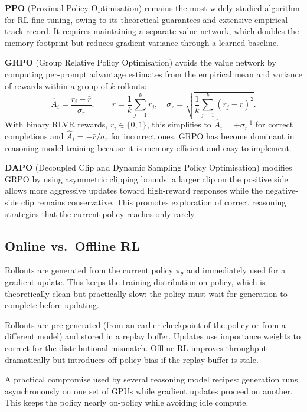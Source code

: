 \textbf{PPO} (Proximal Policy Optimisation)
remains the most widely studied algorithm for RL fine-tuning, owing
to its theoretical guarantees and extensive empirical track record.
It requires maintaining a separate value network, which doubles the
memory footprint but reduces gradient variance through a learned baseline.

\textbf{GRPO} (Group Relative Policy Optimisation) avoids
the value network by computing per-prompt advantage estimates from
the empirical mean and variance of rewards within a group of $k$
rollouts:
\begin{equation}
\label{eq:grpo-advantage}
\hat{A}_i = \frac{r_i - \bar{r}}{\sigma_r}, \qquad
\bar{r} = \frac{1}{k}\sum_{j=1}^k r_j, \quad
\sigma_r = \sqrt{\frac{1}{k}\sum_{j=1}^k (r_j - \bar{r})^2}.
\end{equation}
With binary RLVR rewards, $r_i \in \{0, 1\}$, this simplifies to
$\hat{A}_i = +\sigma_r^{-1}$ for correct completions and
$\hat{A}_i = -\bar{r}/\sigma_r$ for incorrect ones. GRPO has become
dominant in reasoning model training because it is memory-efficient
and easy to implement.

\textbf{DAPO} (Decoupled Clip and Dynamic Sampling Policy
Optimisation) modifies GRPO by using asymmetric clipping bounds: a
larger clip on the positive side allows more aggressive updates toward
high-reward responses while the negative-side clip remains conservative.
This promotes exploration of correct reasoning strategies that the
current policy reaches only rarely.

\subsection{Online vs.\ Offline RL}
\label{subsec:online-offline}

\begin{description}[leftmargin=!,labelwidth=3.5cm]
\item[Online RL] Rollouts are generated from the current policy
  $\pi_\theta$ and immediately used for a gradient update. This keeps
  the training distribution on-policy, which is theoretically clean
  but practically slow: the policy must wait for generation to complete
  before updating.

\item[Offline RL] Rollouts are pre-generated (from an earlier
  checkpoint of the policy or from a different model) and stored in a
  replay buffer. Updates use importance weights to correct for the
  distributional mismatch. Offline RL improves throughput dramatically
  but introduces off-policy bias if the replay buffer is stale.

\item[Asynchronous RL] A practical compromise used by several
  reasoning model recipes: generation runs asynchronously on one set
  of GPUs while gradient updates proceed on another. This keeps the
  policy nearly on-policy while avoiding idle compute.
\end{description}


